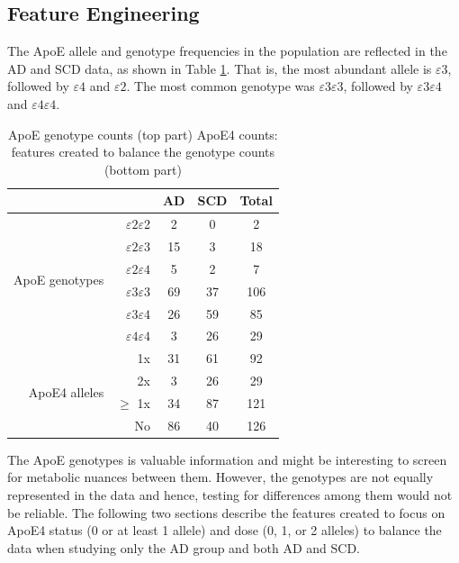 \documentclass{amsart}
\begin{document}
\subsection{Feature Engineering}\label{featureeng}
The ApoE allele and genotype frequencies in the population are reflected in the AD and SCD data, as shown in Table \ref{tab:ApoEfreq}. That is, the most abundant allele is $\varepsilon$3, followed by $\varepsilon4$ and $\varepsilon2$. The most common genotype was $\varepsilon3\varepsilon3$, followed by $\varepsilon3\varepsilon4$ and $\varepsilon4\varepsilon4$.

\begin{table}[htb]
\caption{ApoE genotype counts (top part) ApoE4 counts: features created to balance the genotype counts (bottom part)}
\label{tab:ApoEfreq}
\begin{tabular}{rrccc}
\toprule
\multicolumn{1}{l}{}             & \multicolumn{1}{l}{}       & AD & SCD & Total \\ \midrule
\multirow{6}{*}{ApoE genotypes} & $\varepsilon2\varepsilon$2 & 2  & 0   & 2     \\
                                 & $\varepsilon2\varepsilon3$ & 15 & 3   & 18    \\
                                 & $\varepsilon2\varepsilon4$ & 5  & 2   & 7     \\
                                 & $\varepsilon3\varepsilon3$ & 69 & 37  & 106   \\
                                 & $\varepsilon3\varepsilon4$ & 26 & 59  & 85    \\
                                 & $\varepsilon4\varepsilon4$ & 3  & 26  & 29    \\ \midrule
\multirow{4}{*}{ApoE4 alleles}           & 1x                         & 31 & 61  & 92   \\
                                 & 2x                         & 3  & 26  & 29    \\
                                 & $\geq$ 1x                & 34 & 87  & 121   \\
                                 & No                         & 86 & 40  & 126  \\ \bottomrule
\end{tabular}
\end{table}


The ApoE genotypes is valuable information and might be interesting to screen for metabolic nuances between them. However, the genotypes are not equally represented in the data and hence, testing for differences among them would not be reliable. The following two sections describe the features created to focus on ApoE4 status (0 or at least 1 allele) and dose (0, 1, or 2 alleles) to balance the data when studying only the AD group and both AD and SCD.
\end{document}
